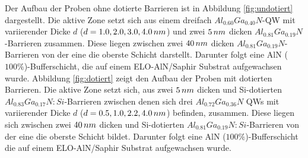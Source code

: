 \noindent 
Der Aufbau der Proben ohne dotierte Barrieren ist in Abbildung \ref{fig:undotiert} dargestellt.
Die aktive Zone setzt sich aus einem dreifach $ Al_{0.60}Ga_{0.40}N$-QW mit variierender Dicke $d$ ($d=1.0, 2.0, 3.0, 4.0 \thinspace nm$) und zwei $5 \thinspace nm$ dicken $ Al_{0.81}Ga_{0.19}N$-Barrieren zusammen. Diese liegen zwischen zwei $40 \thinspace nm$ dicken $ Al_{0.81}Ga_{0.19}N$-Barrieren von der eine die oberste Schicht darstellt. Darunter folgt eine AlN ($100\%$)-Bufferschicht, die auf einem ELO-AlN/Saphir Substrat aufgewachsen wurde. 
\newline
Abbildung \ref{fig:dotiert} zeigt den Aufbau der Proben mit dotierten Barrieren. Die aktive Zone setzt sich, aus zwei $5 \thinspace nm$ dicken und Si-dotierten $ Al_{0.83}Ga_{0.17}N:Si$-Barrieren zwischen denen sich drei $ Al_{0.72}Ga_{0.36}N$ QWs mit variierender Dicke $d$ ($d=0.5, 1.0, 2.2, 4.0 \thinspace nm$) befinden, zusammen. Diese liegen sich zwischen zwei $40 \thinspace nm$ dicken und Si-dotierten $ Al_{0.81}Ga_{0.19}N:Si$-Barrieren von der eine die oberste Schicht bildet. Darunter folgt eine AlN ($100\%$)-Bufferschicht die auf einem ELO-AlN/Saphir Substrat aufgewachsen wurde. 
